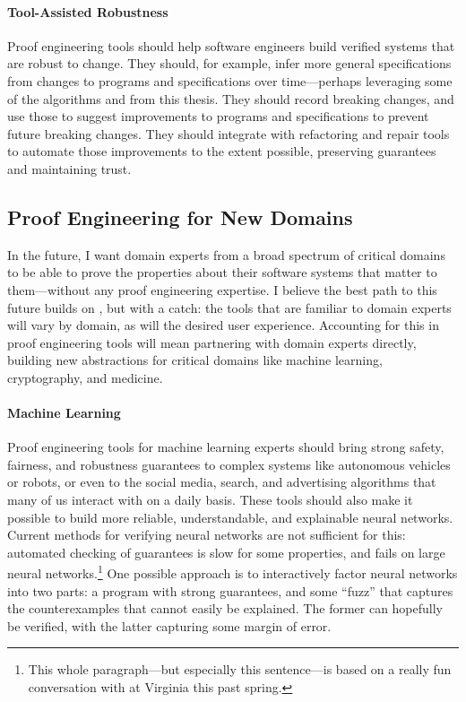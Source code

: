 \paragraph{Tool-Assisted Robustness}
Proof engineering tools should help software engineers build verified systems that are robust to change.
They should, for example, infer more general specifications from changes to programs and specifications over time---perhaps
leveraging some of the  algorithms and  from this thesis.
They should record breaking changes, and use those to suggest improvements to programs and specifications to prevent future breaking changes.
They should integrate with refactoring and repair tools to automate those improvements to the extent possible,
preserving guarantees and maintaining trust.

\subsection*{Proof Engineering for New Domains}

In the future, I want domain experts from a broad spectrum of critical domains to be able to prove the properties
about their software systems that matter to them---without any proof engineering expertise.
I believe the best path to this future builds on , but with a catch:
the tools that are familiar to domain experts will vary by domain, as will the desired user experience.
Accounting for this in proof engineering tools will mean partnering with domain experts directly,
building new abstractions for critical domains like machine learning, cryptography, and medicine.

\paragraph{Machine Learning}
Proof engineering tools for machine learning experts should bring strong safety, fairness, and robustness guarantees to
complex systems like autonomous vehicles or robots, or even to the social media, search, and advertising algorithms that many of us interact with
on a daily basis. These tools should also make it possible to build more reliable, understandable, and explainable neural networks.
Current methods for verifying neural networks are not sufficient for this: 
automated checking of guarantees is slow for some properties, and fails on large 
neural networks.\footnote{This whole paragraph---but especially this sentence---is based on a really fun conversation with  at Virginia this past spring.}
One possible approach is to interactively factor neural networks into two parts: a program with strong guarantees,
and some ``fuzz'' that captures the counterexamples that cannot easily be explained.
The former can hopefully be verified, with the latter capturing some margin of error.

